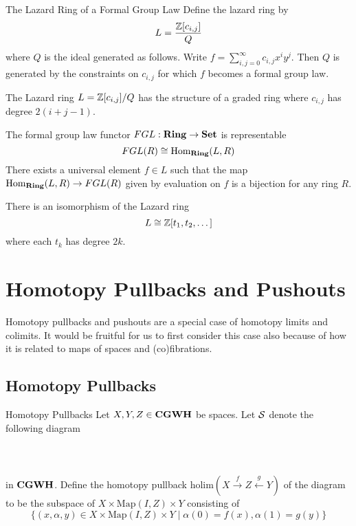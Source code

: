 \documentclass[a4paper]{article}
\begin{document}
\begin{defn}{The Lazard Ring of a Formal Group Law}{} Define the lazard ring by $$L=\frac{\mathbb{Z}[c_{i,j}]}{Q}$$ where $Q$ is the ideal generated as follows. Write $f=\sum_{i,j=0}^\infty c_{i,j}x^iy^j$. Then $Q$ is generated by the constraints on $c_{i,j}$ for which $f$ becomes a formal group law. 
\end{defn}

\begin{lmm}{}{} The Lazard ring $L=\mathbb{Z}[c_{i,j}]/Q$ has the structure of a graded ring where $c_{i,j}$ has degree $2(i+j-1)$. 
\end{lmm}

\begin{thm}{}{} The formal group law functor $FGL:\bold{Ring}\to\bold{Set}$ is representable $$FGL(R)\cong\operatorname{Hom}_\bold{Ring}(L,R)$$ There exists a universal element $f\in L$ such that the map $\operatorname{Hom}_\bold{Ring}(L,R)\to FGL(R)$ given by evaluation on $f$ is a bijection for any ring $R$. 
\end{thm}

\begin{thm}{}{} There is an isomorphism of the Lazard ring $$L\cong\mathbb{Z}[t_1,t_2,\dots]$$ where each $t_k$ has degree $2k$. 
\end{thm}

\pagebreak
\section{Homotopy Pullbacks and Pushouts}
Homotopy pullbacks and pushouts are a special case of homotopy limits and colimits. It would be fruitful for us to first consider this case also because of how it is related to maps of spaces and (co)fibrations. 

\subsection{Homotopy Pullbacks}
\begin{defn}{Homotopy Pullbacks}{} Let $X,Y,Z\in\bold{CGWH}$ be spaces. Let $\mathcal{S}$ denote the following diagram \\~\\
\\~\\
in $\bold{CGWH}$. Define the homotopy pullback $\text{holim}(X\overset{f}{\rightarrow}Z\overset{g}{\leftarrow}Y)$ of the diagram to be the subspace of $X\times\text{Map}(I,Z)\times Y$ consisting of $$\{(x,\alpha,y)\in X\times\text{Map}(I,Z)\times Y\;|\;\alpha(0)=f(x),\alpha(1)=g(y)\}$$
\end{defn}
\end{document}
